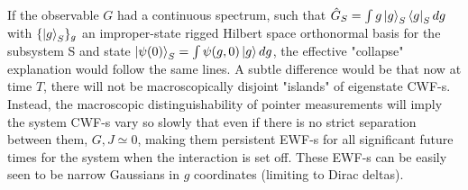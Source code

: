 \documentclass[11pt, a4paper]{article} %
\begin{document}
If the observable $G$ had a continuous spectrum, such that $\hat{G}_S=\int g\ket{g}_S\bra{g}_Sdg$ with $\{\ket{g}_S\}_g$ an improper-state rigged Hilbert space orthonormal basis for the subsystem S and state $\ket{\psi(0)}_S=\int\psi(g,0)\ket{g}dg$, the effective "collapse" explanation would follow the same lines. A subtle difference would be that now at time $T$, there will not be macroscopically disjoint "islands" of eigenstate CWF-s. Instead, the macroscopic distinguishability of pointer measurements will imply the system CWF-s vary so slowly that even if there is no strict separation between them, $G,J\simeq 0$, making them persistent EWF-s for all significant future times for the system when the interaction is set off. These EWF-s can be easily seen to be narrow Gaussians in $g$ coordinates (limiting to Dirac deltas).\vspace{-0.1cm}
%
\end{document}
